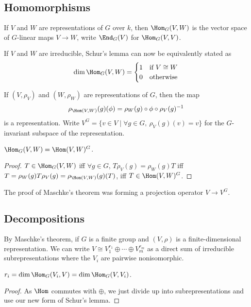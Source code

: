 \documentclass{article}
\begin{document}
\subsection{Homomorphisms}

\begin{definition}
    If $V$ and $W$ are representations of $G$ over $k$, then $\Hom_G(V,W)$ is the vector space of $G$-linear maps $V\rightarrow W$, write $\End_G(V)$ for $\Hom_G(V,V)$.
\end{definition}

If $V$ and $W$ are irreducible, Schur's lemma can now be equivalently stated as\[
\dim\Hom_G(V,W) = \begin{cases}
    1 & \text{if $V\cong W$}\\
    0 & \text{otherwise}
\end{cases}
\]

\begin{definition}
    If $(V,\rho_V)$ and $(W,\rho_W)$ are representations of $G$, then the map \[\rho_{\Hom(V,W)}(g)(\phi) = \rho_W(g)\circ\phi\circ \rho_V(g)^{-1}\]
    is a representation. Write $V^G = \{v\in V \mid \forall g \in G, \ \rho_V(g)(v) = v\}$ for the $G$-invariant subspace of the representation.
\end{definition}

\begin{proposition}
    $\Hom_G(V,W) = \Hom(V,W)^G$.\begin{proof}
        $T\in \Hom_G(V,W)$ iff $\forall g\in G$, $T\rho_V(g) = \rho_W(g)T$ iff $T = \rho_W(g) T \rho_V(g) = \rho_{\Hom(V,W)}(g)(T)$, iff $T \in \Hom(V,W)^G$.
    \end{proof}
\end{proposition}

The proof of Maschke's theorem was forming a projection operator $V\rightarrow V^G$.

\subsection{Decompositions}

By Maschke's theorem, if $G$ is a finite group and $(V,\rho)$ is a finite-dimensional representation. We can write $V\cong V_1^{r_1}\oplus \cdots \oplus V_m^{r_m}$ as a direct sum of irreducible subrepresentations where the $V_i$ are pairwise nonisomorphic.

\begin{proposition}
    $r_i = \dim\Hom_G(V_i,V) = \dim\Hom_G(V,V_i)$.\begin{proof}
        As $\Hom$ commutes with $\oplus$, we just divide up into subrepresentations and use our new form of Schur's lemma.
    \end{proof}
\end{proposition}
\end{document}

